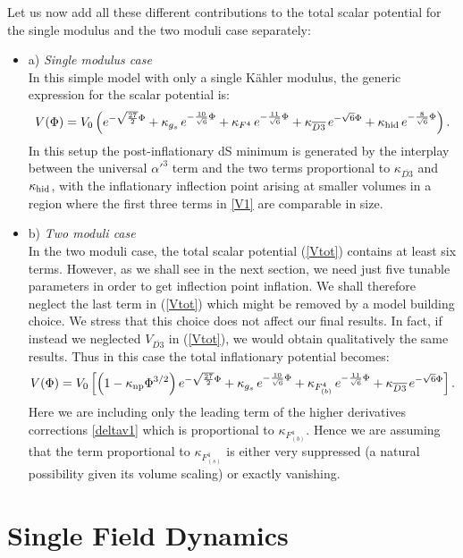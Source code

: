 \documentclass[12pt,a4paper]{book}
\newcommand{\bi}{\begin{itemize}}
\newcommand{\ei}{\end{itemize}}
\begin{document}
Let us now add all these different contributions to the total scalar potential for the single modulus and the two moduli case separately: 
\bi
\item[a)] \textit{Single modulus case}\\
In this simple model with only a single K\"ahler modulus, the generic expression for the scalar potential is:
\begin{align}
V(\Phi) = V_0 \left(e^{-\sqrt{\frac{27}{2}} \Phi} + \kappa_{g_s} \,e^{- \frac{10}{\sqrt{6}} \Phi} + \kappa_{F^4} \,e^{- \frac{11}{\sqrt{6}} \Phi} 
+ \kappa_{\overline{D3}} \,e^{- {\sqrt{6}} \Phi} + \kappa_{\rm hid} \,e^{- \frac{8}{\sqrt{6}} \Phi}\right).
\label{V1}
\end{align}
In this setup the post-inflationary dS minimum is generated by the interplay between the universal $\alpha'^3$ term and the two terms proportional to $\kappa_{\overline{D3}}$ and $\kappa_{\rm hid}$, with the inflationary inflection point arising at smaller volumes in a region where the first three terms in \eqref{V1} are comparable in size. 

\item[b)] \textit{Two moduli case}\\
In the two moduli case, the total scalar potential (\ref{Vtot}) contains at least six terms. However, as we shall see in the next section, we need just five tunable parameters in order to get inflection point inflation. We shall therefore neglect the last term in (\ref{Vtot}) which might be removed by a model building choice. We stress that this choice does not affect our final results. In fact, if instead we neglected $V_{\overline{D3}}$ in (\ref{Vtot}), we would obtain qualitatively the same results. Thus in this case the total inflationary potential becomes:
\begin{align}
V(\Phi) = V_0 \left[\left(1 - \kappa_{\rm np} \Phi^{3/2}\right) e^{-\sqrt{\frac{27}{2}} \Phi} + \kappa_{g_s} \,e^{-\frac{10}{\sqrt{6}} \Phi} 
+ \kappa_{F^4_{(b)}} \,e^{-\frac{11}{\sqrt{6}} \Phi} + \kappa_{\overline{D3}}\, e^{- \sqrt{6} \Phi}\right].
\label{V2}
\end{align}
Here we are including only the leading term of the higher derivatives corrections \eqref{deltav1} which is proportional to $\kappa_{F^4_{(b)}}$. Hence we are assuming that the term proportional to $\kappa_{F^4_{(s)}}$ is either very suppressed (a natural possibility given its volume scaling) or exactly vanishing.
\ei

\section{Single Field Dynamics}
\label{SecSingle}
\end{document}
